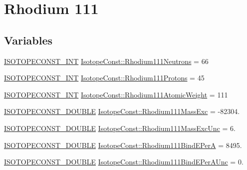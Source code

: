 \hypertarget{group___isotope_const-_rhodium-_rh111}{}\section{Rhodium 111}
\label{group___isotope_const-_rhodium-_rh111}
\subsection*{Variables}
\begin{DoxyCompactItemize}
\item 
\mbox{\hyperlink{group___isotope_const-_macros_ga5f18360b3e99483a35c32d789e62621c}{I\+S\+O\+T\+O\+P\+E\+C\+O\+N\+S\+T\+\_\+\+I\+NT}} \mbox{\hyperlink{group___isotope_const-_rhodium-_rh111_gacf1d0eba57a08372282d82cdc033c604}{Isotope\+Const\+::\+Rhodium111\+Neutrons}} = 66
\item 
\mbox{\hyperlink{group___isotope_const-_macros_ga5f18360b3e99483a35c32d789e62621c}{I\+S\+O\+T\+O\+P\+E\+C\+O\+N\+S\+T\+\_\+\+I\+NT}} \mbox{\hyperlink{group___isotope_const-_rhodium-_rh111_ga2b429bdf94c1a9e3481f0a965bbb4611}{Isotope\+Const\+::\+Rhodium111\+Protons}} = 45
\item 
\mbox{\hyperlink{group___isotope_const-_macros_ga5f18360b3e99483a35c32d789e62621c}{I\+S\+O\+T\+O\+P\+E\+C\+O\+N\+S\+T\+\_\+\+I\+NT}} \mbox{\hyperlink{group___isotope_const-_rhodium-_rh111_ga2af258cb77d391f90d9c498fdc00e142}{Isotope\+Const\+::\+Rhodium111\+Atomic\+Weight}} = 111
\item 
\mbox{\hyperlink{group___isotope_const-_macros_ga8f45a7272ce02c0b4c65c44636ed719a}{I\+S\+O\+T\+O\+P\+E\+C\+O\+N\+S\+T\+\_\+\+D\+O\+U\+B\+LE}} \mbox{\hyperlink{group___isotope_const-_rhodium-_rh111_ga58e11ce2c018e5a97c6d218757f02de2}{Isotope\+Const\+::\+Rhodium111\+Mass\+Exc}} = -\/82304.
\item 
\mbox{\hyperlink{group___isotope_const-_macros_ga8f45a7272ce02c0b4c65c44636ed719a}{I\+S\+O\+T\+O\+P\+E\+C\+O\+N\+S\+T\+\_\+\+D\+O\+U\+B\+LE}} \mbox{\hyperlink{group___isotope_const-_rhodium-_rh111_ga14ecb200b0c296e5378fb4da635f3249}{Isotope\+Const\+::\+Rhodium111\+Mass\+Exc\+Unc}} = 6.
\item 
\mbox{\hyperlink{group___isotope_const-_macros_ga8f45a7272ce02c0b4c65c44636ed719a}{I\+S\+O\+T\+O\+P\+E\+C\+O\+N\+S\+T\+\_\+\+D\+O\+U\+B\+LE}} \mbox{\hyperlink{group___isotope_const-_rhodium-_rh111_ga118f6dc31f593ccb25eee77faba6f069}{Isotope\+Const\+::\+Rhodium111\+Bind\+E\+PerA}} = 8495.
\item 
\mbox{\hyperlink{group___isotope_const-_macros_ga8f45a7272ce02c0b4c65c44636ed719a}{I\+S\+O\+T\+O\+P\+E\+C\+O\+N\+S\+T\+\_\+\+D\+O\+U\+B\+LE}} \mbox{\hyperlink{group___isotope_const-_rhodium-_rh111_ga35ca3f03d5cc0148b19529e1703db76d}{Isotope\+Const\+::\+Rhodium111\+Bind\+E\+Per\+A\+Unc}} = 0.

\end{DoxyCompactItemize}
